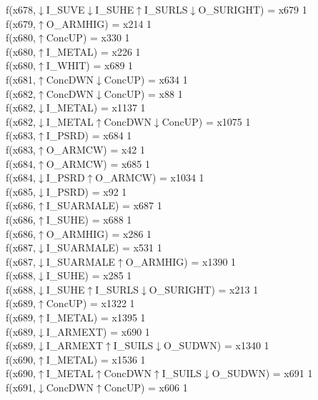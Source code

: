 f(x678,$\downarrow$I\_SUVE$\downarrow$I\_SUHE$\uparrow$I\_SURLS$\downarrow$O\_SURIGHT) = x679 {1} \\
f(x679,$\uparrow$O\_ARMHIG) = x214 {1} \\
f(x680,$\uparrow$ConcUP) = x330 {1} \\
f(x680,$\uparrow$I\_METAL) = x226 {1} \\
f(x680,$\uparrow$I\_WHIT) = x689 {1} \\
f(x681,$\uparrow$ConcDWN$\downarrow$ConcUP) = x634 {1} \\
f(x682,$\uparrow$ConcDWN$\downarrow$ConcUP) = x88 {1} \\
f(x682,$\downarrow$I\_METAL) = x1137 {1} \\
f(x682,$\downarrow$I\_METAL$\uparrow$ConcDWN$\downarrow$ConcUP) = x1075 {1} \\
f(x683,$\uparrow$I\_PSRD) = x684 {1} \\
f(x683,$\uparrow$O\_ARMCW) = x42 {1} \\
f(x684,$\uparrow$O\_ARMCW) = x685 {1} \\
f(x684,$\downarrow$I\_PSRD$\uparrow$O\_ARMCW) = x1034 {1} \\
f(x685,$\downarrow$I\_PSRD) = x92 {1} \\
f(x686,$\uparrow$I\_SUARMALE) = x687 {1} \\
f(x686,$\uparrow$I\_SUHE) = x688 {1} \\
f(x686,$\uparrow$O\_ARMHIG) = x286 {1} \\
f(x687,$\downarrow$I\_SUARMALE) = x531 {1} \\
f(x687,$\downarrow$I\_SUARMALE$\uparrow$O\_ARMHIG) = x1390 {1} \\
f(x688,$\downarrow$I\_SUHE) = x285 {1} \\
f(x688,$\downarrow$I\_SUHE$\uparrow$I\_SURLS$\downarrow$O\_SURIGHT) = x213 {1} \\
f(x689,$\uparrow$ConcUP) = x1322 {1} \\
f(x689,$\uparrow$I\_METAL) = x1395 {1} \\
f(x689,$\downarrow$I\_ARMEXT) = x690 {1} \\
f(x689,$\downarrow$I\_ARMEXT$\uparrow$I\_SUILS$\downarrow$O\_SUDWN) = x1340 {1} \\
f(x690,$\uparrow$I\_METAL) = x1536 {1} \\
f(x690,$\uparrow$I\_METAL$\uparrow$ConcDWN$\uparrow$I\_SUILS$\downarrow$O\_SUDWN) = x691 {1} \\
f(x691,$\downarrow$ConcDWN$\uparrow$ConcUP) = x606 {1} \\
